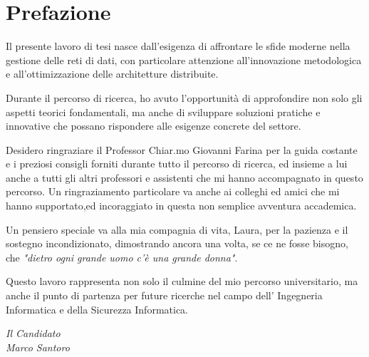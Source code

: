 \chapter*{Prefazione}

\begin{em} %

Il presente lavoro di tesi nasce dall'esigenza di affrontare le sfide moderne nella gestione delle reti di dati, 
con particolare attenzione all'innovazione metodologica e all'ottimizzazione delle architetture distribuite.

Durante il percorso di ricerca, ho avuto l'opportunità di approfondire non solo gli aspetti teorici 
fondamentali, ma anche di sviluppare soluzioni pratiche e innovative che possano rispondere alle 
esigenze concrete del settore.

Desidero ringraziare il Professor Chiar.mo Giovanni Farina per la guida costante e i preziosi consigli 
forniti durante tutto il percorso di ricerca, ed insieme a lui anche a tutti gli altri professori e assistenti che mi hanno accompagnato in questo percorso.
Un ringraziamento particolare va anche ai colleghi ed amici che mi hanno supportato,ed incoraggiato in questa non semplice avventura accademica.

Un pensiero speciale va alla mia compagnia di vita, Laura, per la pazienza e il sostegno incondizionato, dimostrando ancora una volta, se ce ne fosse bisogno, che {\emph{"dietro ogni grande uomo c'è una grande donna"}}.

Questo lavoro rappresenta non solo il culmine del mio percorso universitario, ma anche il punto di partenza per future ricerche nel campo dell' Ingegneria Informatica e della Sicurezza Informatica.

\end{em}

\vspace{2cm}
\begin{flushright}
\textit{Il Candidato}\\
\textit{Marco Santoro}
\end{flushright}